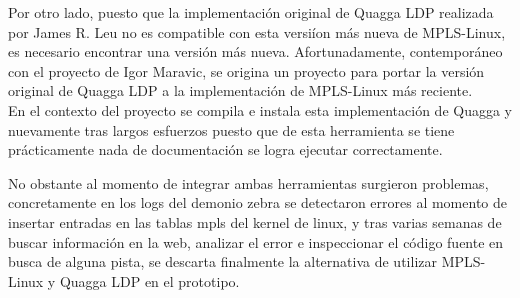 Por otro lado, puesto que la implementaci\'on original de Quagga LDP realizada por James R. Leu no es compatible con esta versi\'ion m\'as nueva de MPLS-Linux, es necesario encontrar una versi\'on m\'as nueva. Afortunadamente, contemporáneo con el proyecto de Igor Maravic, se origina un proyecto\citep{QuaggaLDP2} para portar la versi\'on original de Quagga LDP a la implementaci\'on de MPLS-Linux m\'as reciente.\\

En el contexto del proyecto se compila e instala esta implementaci\'on de Quagga y nuevamente tras largos esfuerzos puesto que de esta herramienta se tiene prácticamente nada de documentaci\'on se logra ejecutar correctamente. 

No obstante al momento de integrar ambas herramientas surgieron problemas, concretamente en los logs del demonio zebra se detectaron errores al momento de insertar entradas en las tablas mpls del kernel de linux, y tras varias semanas de buscar informaci\'on en la web, analizar el error e inspeccionar el código fuente en busca de alguna pista, se descarta finalmente la alternativa de utilizar MPLS-Linux y Quagga LDP en el prototipo. 
